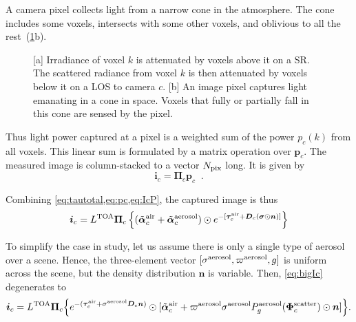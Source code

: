 \documentclass[10pt,letterpaper]{article}
\newcommand{\vect}[1]{\bm{#1}}
\newcommand{\yoavcomment}[1]{}
\renewcommand{\yoavcomment}[1]{#1} %
\begin{document}
A camera pixel collects light from a narrow cone in the
atmosphere. The cone includes some voxels, intersects with some other
voxels, and oblivious to all the rest~(\cref{fig:projection}b).
\begin{figure}
  \centering
  \yoavcomment{\def\svgwidth{0.8\columnwidth}}
  \caption{\small [a] Irradiance of voxel $k$ is attenuated by voxels
    above it on a SR. The scattered radiance from voxel $k$ is then
    attenuated by voxels below it on a LOS to camera $c$.  [b] An
    image pixel captures light emanating in a cone in space. Voxels
    that fully or partially fall in this cone are sensed by the
    pixel.}
  \label{fig:projection}
\end{figure}
Thus light power captured at a pixel is a weighted sum of the power
$p_c(k)$ from all voxels.  This linear sum is formulated by a matrix
operation over ${\bm p}_c$. The measured image is column-stacked to a
vector $N_{\rm pix}$ long. It is given by
\begin{equation}
  {\bm i}_c= {\vect{\Pi}}_c{\bm p}_c
  \;\;.
  \label{eq:IcP}
\end{equation}

Combining \cref{eq:tautotal,eq:pc,eq:IcP}, the captured image is thus
\begin{align}
  {\bm i}_c= L^{\rm TOA} {\vect{\Pi}}_c \left\{
    (\tilde{\vect{\alpha}}^{\rm air}_c + \tilde{\vect{\alpha}}^{\rm
      aerosol}_c) \odot e^{-[\vect{\tau}_c^{\rm air} + {\bm D}_c
      (\vect{\sigma} \odot {\bm n})]} \right\}
  \label{eq:bigIc}
\end{align}

To simplify the case in study, let us assume there is only a single
type of aerosol over a scene. Hence, the three-element vector
$[{\sigma}^{\rm aerosol},\varpi^{\rm aerosol},g]$ is uniform across
the scene, but the density distribution ${\bm n}$ is variable. Then,
\cref{eq:bigIc} degenerates to
\begin{align}
  {\bm i}_c= L^{\rm TOA} {\vect{\Pi}}_c \Big\{ e^{-(\vect{\tau}_c^{\rm
      air} + {\sigma}^{\rm aerosol} {\bm D}_c {\bm n}) }\odot
  [\tilde{\vect{\alpha}}^{\rm air}_c + \varpi^{\rm aerosol}\sigma^{\rm
    aerosol} P^{\rm aerosol}_g(\vect{\Phi}^{\rm scatter}_c) \odot{\bm
    n} ] \Big\} .
  \label{eq:bigIA}
\end{align}

\end{document}
